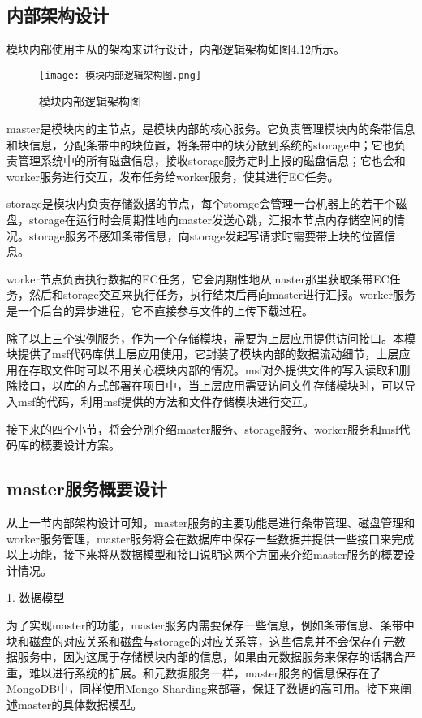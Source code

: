 \subsection{内部架构设计}%
模块内部使用主从的架构来进行设计，内部逻辑架构如图4.12所示。

\begin{figure}[h]
  \centering
  \texttt{[image: 模块内部逻辑架构图.png]}
  \caption{模块内部逻辑架构图}
\end{figure}

master是模块内的主节点，是模块内部的核心服务。它负责管理模块内的条带信息和块信息，分配条带中的块位置，将条带中的块分散到系统的storage中；它也负责管理系统中的所有磁盘信息，接收storage服务定时上报的磁盘信息；它也会和worker服务进行交互，发布任务给worker服务，使其进行EC任务。

storage是模块内负责存储数据的节点，每个storage会管理一台机器上的若干个磁盘，storage在运行时会周期性地向master发送心跳，汇报本节点内存储空间的情况。storage服务不感知条带信息，向storage发起写请求时需要带上块的位置信息。

worker节点负责执行数据的EC任务，它会周期性地从master那里获取条带EC任务，然后和storage交互来执行任务，执行结束后再向master进行汇报。worker服务是一个后台的异步进程，它不直接参与文件的上传下载过程。

除了以上三个实例服务，作为一个存储模块，需要为上层应用提供访问接口。本模块提供了msf代码库供上层应用使用，它封装了模块内部的数据流动细节，上层应用在存取文件时可以不用关心模块内部的情况。msf对外提供文件的写入读取和删除接口，以库的方式部署在项目中，当上层应用需要访问文件存储模块时，可以导入msf的代码，利用msf提供的方法和文件存储模块进行交互。

接下来的四个小节，将会分别介绍master服务、storage服务、worker服务和msf代码库的概要设计方案。

\subsection{master服务概要设计}

从上一节内部架构设计可知，master服务的主要功能是进行条带管理、磁盘管理和worker服务管理，master服务将会在数据库中保存一些数据并提供一些接口来完成以上功能，接下来将从数据模型和接口说明这两个方面来介绍master服务的概要设计情况。

1. 数据模型

为了实现master的功能，master服务内需要保存一些信息，例如条带信息、条带中块和磁盘的对应关系和磁盘与storage的对应关系等，这些信息并不会保存在元数据服务中，因为这属于存储模块内部的信息，如果由元数据服务来保存的话耦合严重，难以进行系统的扩展。和元数据服务一样，master服务的信息保存在了MongoDB中，同样使用Mongo Sharding来部署，保证了数据的高可用。接下来阐述master的具体数据模型。

